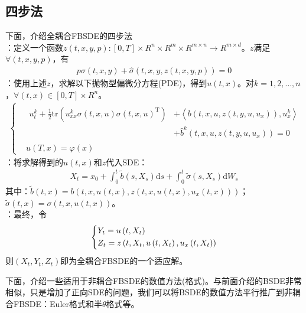 	\subsection{四步法}
	下面，介绍全耦合FBSDE的四步法\\
		：定义一个函数$z(t,x,y,p):[0,T]\times R^n\times R^m\times R^{m\times n}\rightarrow {R^{m\times d}}$。$z$满足$\forall(t,x,y,p)$，有
		\begin{align*}
		p\sigma \left( {t,x,y} \right) + \hat \sigma \left( {t,x,y,z\left( {t,x,y,p} \right)} \right) = 0
		\end{align*}
		：使用上述$z$，求解以下抛物型偏微分方程(PDE)，得到$u(t,x)$。对$k=1,2,\dots,n$，$\forall(t,x) \in [0,T]\times R^n$。
		\begin{align*}
		\left\{
		\begin{aligned}
		& \begin{aligned}
		u_t ^k + \frac{1}{2}\mathrm{tr}\left( {u_{xx}^k\sigma \left( {t,x,u} \right)\sigma {{\left( {t,x,u} \right)}^\mathrm{T}}} \right) &+ \left\langle {b\left( {t,x,u,z\left( {t,y,u,{u_x}} \right)} \right),u_x^k} \right\rangle\\
			&+ {{\hat b}^k}\left( {t,x,u,z\left( {t,y,u,{u_x}} \right)} \right) = 0
		\end{aligned}\\
		& u(T,x)=\varphi(x)
		\end{aligned}
		\right.
		\end{align*}
		：将求解得到的$u(t,x)$和$z$代入SDE：
		\begin{align*}
		{X_t} = {x_0} + \int_0^t {\tilde b\left( {s,{X_s}} \right)\mathrm{d}s}  + \int_0^t {\tilde \sigma \left( {s,{X_s}} \right)\mathrm{d}{W_s}} \end{align*}
		其中：$\tilde b(t,x)=b(t,x,u(t,x),z(t,x,u(t,x),u_x(t,x)))$；$\tilde\sigma (t,x)=\sigma(t,x,u(t,x))$。\\
		：最终，令
					\begin{equation*}
				\centering
				\left\{\begin{lgathered}
				{{Y_t} = u\left( {t,{X_t}} \right)}\\
				{{Z_t} = z\left( {t,{X_t},u\left( {t,{X_t}} \right),{u_x}\left( {t,{X_t}} \right)} \right)}
				\end{lgathered} \right.
					\end{equation*}
		 则$(X_t,Y_t,Z_t)$即为全耦合FBSDE的一个适应解。

		\par
		下面，介绍一些适用于非耦合FBSDE的数值方法(格式)。与前面介绍的BSDE非常相似，只是增加了正向SDE的问题，我们可以将BSDE的数值方法平行推广到非耦合FBSDE：Euler格式和半$\theta$格式等。

